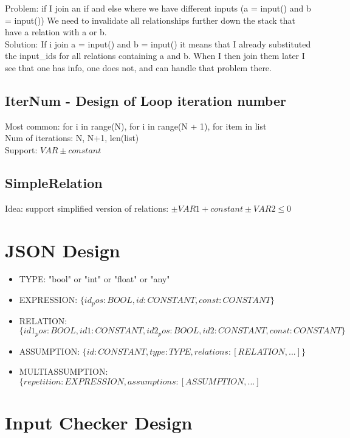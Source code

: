 \documentclass[11pt]{article}
\begin{document}
Problem: if I join an if and else where we have different inputs (a = input() and b = input()) We need to invalidate all relationships further down the stack that have a relation with a or b.\\
Solution: If i join a = input() and b = input() it means that I already substituted the input\_ids for all relations containing a and b. When I then join them later I see that one has info, one does not, and can handle that problem there.

\subsection{IterNum - Design of Loop iteration number}

Most common: for i in range(N), for i in range(N + 1), for item in list\\
Num of iterations: N, N+1, len(list)\\
Support: $VAR \pm constant$

\subsection{SimpleRelation}

Idea: support simplified version of relations: $\pm VAR1 + constant \pm VAR2 \leq 0$

\section{JSON Design}

\begin{itemize}
  \item TYPE: "bool" or "int" or "float" or "any"
  \item EXPRESSION: $\{id_pos: BOOL, id: CONSTANT, const: CONSTANT\}$
  \item RELATION:  $\{id1_pos: BOOL, id1: CONSTANT, id2_pos: BOOL, id2: CONSTANT, const: CONSTANT\}$
  \item ASSUMPTION: $\{id: CONSTANT, type: TYPE, relations: [RELATION, ...]\}$
  \item MULTIASSUMPTION: $\{repetition: EXPRESSION, assumptions: [ASSUMPTION, ...]$
\end{itemize}

\section{Input Checker Design}
\end{document}
